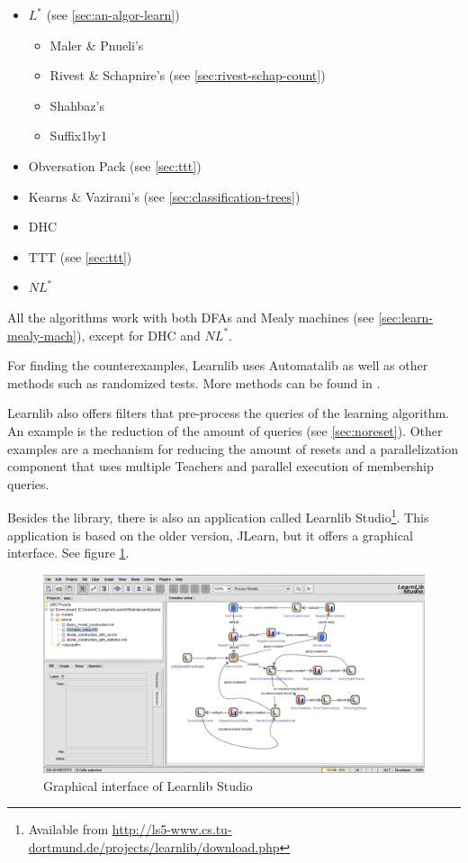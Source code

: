 \documentclass[multi,crop=false,class=article]{standalone}
\begin{document}
\begin{itemize}
	\item $L^*$ (see \cref{sec:an-algor-learn})
	\begin{itemize}
		\item Maler \& Pnueli's \cite{Maler1995}
		\item Rivest \& Schapnire's (see \cref{sec:rivest-schap-count})
		\item Shahbaz's \cite{Shahbaz2009}
		\item Suffix1by1 \cite{Irfan2010}
	\end{itemize}
	\item Obversation Pack (see \cref{sec:ttt})
	\item Kearns \& Vazirani's (see \cref{sec:classification-trees})
	\item DHC \cite{Merten2012}
	\item TTT (see \cref{sec:ttt})
	\item $NL^*$ \cite{Bollig2009}
\end{itemize}

All the algorithms work with both DFAs and Mealy machines (see 
\cref{sec:learn-mealy-mach}), except for DHC\cite{Merten2012} and
$NL^*$\cite{Bollig2009}.

For finding the counterexamples, Learnlib uses Automatalib as well as other
methods such as randomized tests. More methods can be found in
\cite[p. 490]{Isberner2015b}.

Learnlib also offers filters that pre-process the queries of the learning
algorithm. An example is the reduction of the amount of queries (see 
\cref{sec:noreset}). Other examples are a mechanism for reducing the amount of
resets  and a parallelization component that uses multiple Teachers and
parallel execution of membership queries\cite{Henrix2015,Howar2012}.


Besides the library, there is also an application called Learnlib 
Studio\footnote{Available from 
\url{http://ls5-www.cs.tu-dortmund.de/projects/learnlib/download.php}}. 
This application is based on the older version, JLearn, but it offers a 
graphical interface. See figure \ref{fig:learnlib_studio}. 

	\begin{figure}[H]
		\includegraphics[width=\textwidth]{Tool_images/learnlib_studio_interface.png}
		\caption{Graphical interface of Learnlib Studio}
		\label{fig:learnlib_studio}
	\end{figure}
\end{document}
